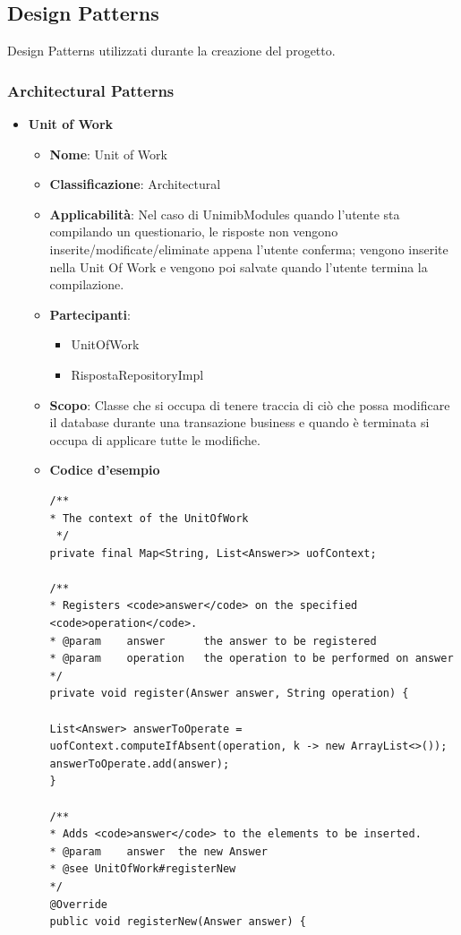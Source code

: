 \documentclass[12pt]{article}
\begin{document}
\subsection{Design Patterns}
Design Patterns utilizzati durante la creazione del progetto.
\subsubsection{Architectural Patterns}
	\begin{itemize}
		\item \textbf{Unit of Work}
    	\begin{itemize}
            \item \textbf{Nome}: Unit of Work
            \item \textbf{Classificazione}: Architectural
            \item \textbf{Applicabilità}: Nel caso di UnimibModules quando l'utente sta compilando un questionario, le risposte non vengono inserite/modificate/eliminate appena l'utente conferma; vengono inserite nella Unit Of Work e vengono poi salvate quando l'utente termina la compilazione.
            \item \textbf{Partecipanti}:
                \begin{itemize}
                    \item {UnitOfWork}
                    \item {RispostaRepositoryImpl}
                    
                \end{itemize}
            \item \textbf{Scopo}: Classe che si occupa di tenere traccia di ciò che possa modificare il database durante una transazione business e quando è terminata si occupa di applicare tutte le modifiche.
             \item \textbf{Codice d'esempio}
            \begin{lstlisting}
/**
* The context of the UnitOfWork
 */
private final Map<String, List<Answer>> uofContext;

/**
* Registers <code>answer</code> on the specified <code>operation</code>.
* @param	answer		the answer to be registered
* @param	operation	the operation to be performed on answer
*/
private void register(Answer answer, String operation) {

List<Answer> answerToOperate = uofContext.computeIfAbsent(operation, k -> new ArrayList<>());
answerToOperate.add(answer);
}

/**
* Adds <code>answer</code> to the elements to be inserted.
* @param	answer	the new Answer
* @see UnitOfWork#registerNew
*/
@Override
public void registerNew(Answer answer) {


\end{lstlisting}
\end{itemize}
\end{itemize}
\end{document}
